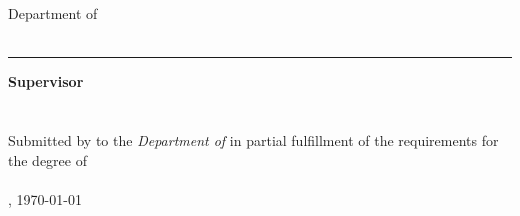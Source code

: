 \begin{titlepage}
    \begin{center}
        {\Large%
           \textsc{\university{}}%
        }
        \\\medskip
        {%
            \textbf{
                \universityFaculty{}
            }\\
            Department of \universityDepartment{}%
        }
        \\\vfill
        {\Huge%
            \textsc{%
                \documentTitle{}%
            }%
        }
        {\large%
            \textsl{%
                \documentSubtitle{}%
            }
        }
        \\\vfill
        {\Large%
            \textbf{\shortTitle{}}%
        }
    \end{center}
	\vfill
	\rule{\textwidth}{.4pt}
	\vfill
    \begin{flushright}
        \textbf{Supervisor}\\
        \medskip
        \researchAdvisor{}\\
        \secondReader{}\\
        \bigskip
        Submitted by \textbf{\documentAuthor{}} to the \textsl{Department of \universityDepartment{}} in partial fulfillment of the requirements for the degree of\\
        \textbf{\academicDegree{}}\\
        \medskip{}
        \documentPlace{}, \germanDate{}\today{}\\
    \end{flushright}
\end{titlepage}
